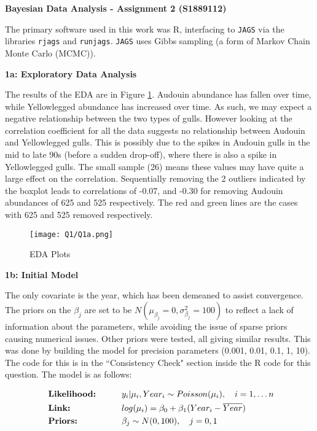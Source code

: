 \documentclass[11pt]{article}
\begin{document}
\setlength{\abovedisplayskip}{-15pt}
\setlength{\belowdisplayskip}{-15pt}
\setlength{\abovedisplayshortskip}{-5pt}
\setlength{\belowdisplayshortskip}{-5pt}


\textbf{Bayesian Data Analysis - Assignment 2 (S1889112)}

The primary software used in this work was R, interfacing to \texttt{JAGS} via the libraries \texttt{rjags} and \texttt{runjags}. \texttt{JAGS} uses Gibbs sampling (a form of Markov Chain Monte Carlo (MCMC)). 

\textbf{1a: Exploratory Data Analysis} \label{sec::1a}


The results of the EDA are in Figure \ref{Fig::1a}. Audouin abundance has fallen over time, while Yellowlegged abundance has increased over time. As such, we may expect a negative relationship between the two types of gulls. However looking at the correlation coefficient for all the data suggests no relationship between Audouin and Yellowlegged gulls. This is possibly due to the spikes in Audouin gulls in the mid to late 90s (before a sudden drop-off), where there is also a spike in Yellowlegged gulls. The small sample (26) means these values may have quite a large effect on the correlation. Sequentially removing the 2 outliers indicated by the boxplot leads to correlations of -0.07, and -0.30 for removing Audouin abundances of 625 and 525 respectively. The red and green lines are the cases with 625 and 525 removed respectively. 

\begin{figure}[!h]
\centering
\texttt{[image: Q1/Q1a.png]}
\caption{EDA Plots} \label{Fig::1a}
\end{figure}

\vspace{-5mm}

\textbf{1b: Initial Model} \label{sec::1b}

The only covariate is the year, which has been demeaned to assist convergence. The priors on the $\beta_j$ are set to be $N(\mu_{\beta_j} = 0, \sigma^2_{\beta_j}  = 100)$ to reflect a lack of information about the parameters, while avoiding the issue of sparse priors causing numerical issues. Other priors were tested, all giving similar results. This was done by building the model for precision parameters (0.001, 0.01, 0.1, 1, 10). The code for this is in the ``Consistency Check" section inside the R code for this question. The model is as follows:

\begin{alignat*}{3}
&\text{\textbf{Likelihood:}} \qquad &&y_i | \mu_i, Year_i \sim Poisson(\mu_i), \quad i = 1, \dots n\\
&\text{\textbf{Link:}}        &&log(\mu_i)                 = \beta_0 + \beta_1(Year_i - \overline{Year})\\
&\text{\textbf{Priors:}}        &&\beta_j \sim N(0, 100), \quad j = 0, 1\\\
\end{alignat*}
\end{document}
